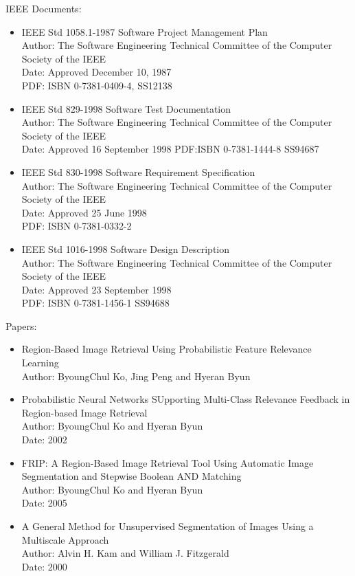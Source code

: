 IEEE Documents:
\begin{itemize}
  \item IEEE Std 1058.1-1987  Software Project Management Plan\\
				Author: The Software Engineering Technical Committee of the Computer Society of the IEEE\\
                Date: Approved December 10, 1987\\
				PDF: ISBN 0-7381-0409-4, SS12138

  \item IEEE Std 829-1998  Software Test Documentation\\
				Author: The Software Engineering Technical Committee of the Computer Society of the IEEE\\
                Date: Approved 16 September 1998
				PDF:ISBN 0-7381-1444-8 SS94687

  \item IEEE Std 830-1998 Software Requirement Specification \\
				Author: The Software Engineering Technical Committee of the Computer Society of the IEEE \\
                Date: Approved 25 June 1998\\
				PDF: ISBN 0-7381-0332-2

  \item IEEE Std 1016-1998 Software Design Description\\
				Author: The Software Engineering Technical Committee of the Computer Society of the IEEE\\
                Date: Approved 23 September 1998\\
				PDF: ISBN 0-7381-1456-1 SS94688	
\end{itemize}

Papers: 

\begin{itemize}
  \item Region-Based Image Retrieval Using Probabilistic Feature Relevance Learning\\
        Author: ByoungChul Ko, Jing Peng and Hyeran Byun
  \item Probabilistic Neural Networks SUpporting Multi-Class Relevance Feedback in Region-based Image Retrieval\\
        Author: ByoungChul Ko and Hyeran Byun\\
        Date: 2002
  \item FRIP: A Region-Based Image Retrieval Tool Using Automatic Image Segmentation and Stepwise Boolean AND Matching\\
        Author: ByoungChul Ko and Hyeran Byun\\
        Date: 2005
  \item A General Method for Unsupervised Segmentation of Images Using a Multiscale Approach\\
        Author: Alvin H. Kam and William J. Fitzgerald\\
        Date: 2000
\end{itemize}

